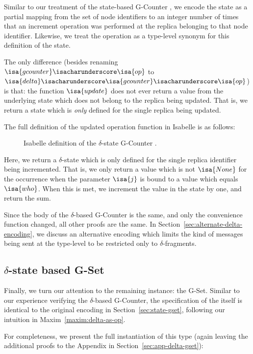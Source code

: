 Similar to our treatment of the state-based G-Counter \CRDT, we encode the state
as a partial mapping from the set of node identifiers to an integer number of
times that an increment operation was performed at the replica belonging to that
node identifier. Likewise, we treat the operation as a type-level synonym for
this definition of the state.

The only difference (besides renaming $\isa{gcounter}\isacharunderscore\isa{op}$
to $\isa{delta}\isacharunderscore\isa{gcounter}\isacharunderscore\isa{op}$) is
that: the function $\isa{update}$ does not ever return a value from the
underlying state which does not belong to the replica being updated. That is, we
return a state which is \emph{only} defined for the single replica being
updated.

The full definition of the updated operation function in Isabelle is as follows:

\begin{figure}[H]
  
  \caption{Isabelle definition of the $\delta$-state G-Counter \CRDT.}
\end{figure}

Here, we return a $\delta$-state which is only defined for the single replica
identifier being incremented. That is, we only return a value which is not
$\isa{None}$ for the occurrence when the parameter $\isa{j}$ is bound to a value
which equals $\isa{who}$. When this is met, we increment the value in the state
by one, and return the sum.

Since the body of the $\delta$-based G-Counter \CRDT is the same, and only the
convenience function changed, all other proofs are the same. In
Section~\ref{sec:alternate-delta-encoding}, we discuss an alternative encoding
which limits the kind of messages being sent at the type-level to be restricted
only to $\delta$-fragments.

\subsection{$\delta$-state based G-Set}

Finally, we turn our attention to the remaining \CRDT instance: the G-Set.
Similar to our experience verifying the $\delta$-based G-Counter, the
specification of the \CRDT itself is identical to the original encoding in
Section~\ref{sec:state-gset}, following our intuition in
Maxim~\ref{maxim:delta-as-op}.

For completeness, we present the full instantiation of this type (again leaving
the additional proofs to the Appendix in Section~\ref{sec:app-delta-gset}):

